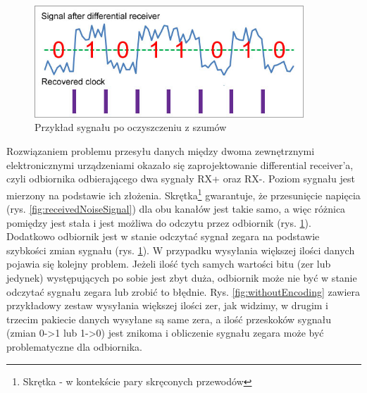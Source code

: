 \documentclass{BscUS}
\begin{document}
\begin{figure}[H]
\centering
\includegraphics[width=0.9\textwidth]{./img/receivedCleanedSignal}
\caption{Przykład sygnału po oczyszczeniu z szumów \cite{receivedCleanedSignal}}
\label{fig:receivedCleanedSignal}
\end{figure}
\noindent Rozwiązaniem problemu przesyłu danych między dwoma zewnętrznymi elektronicznymi urządzeniami okazało się zaprojektowanie differential receiver'a, czyli odbiornika odbierającego dwa sygnały RX+ oraz RX-. Poziom sygnału jest mierzony na podstawie ich złożenia. Skrętka\footnote{Skrętka - w kontekście pary skręconych przewodów} gwarantuje, że przesunięcie napięcia (rys. \ref{fig:receivedNoiseSignal}) dla obu kanałów jest takie samo, a więc różnica pomiędzy jest stała i jest możliwa do odczytu przez odbiornik (rys. \ref{fig:receivedCleanedSignal}). Dodatkowo odbiornik jest w stanie odczytać sygnał zegara na podstawie szybkości zmian sygnału (rys. \ref{fig:receivedCleanedSignal}).
\newline
\indent W przypadku wysyłania większej ilości danych pojawia się kolejny problem. Jeżeli ilość tych samych wartości bitu (zer lub jedynek) występujących po sobie jest zbyt duża, odbiornik może nie być w stanie odczytać sygnału zegara lub zrobić to błędnie. Rys. \ref{fig:withoutEncoding} zawiera przykładowy zestaw wysyłania większej ilości zer, jak widzimy, w drugim i trzecim pakiecie danych wysyłane są same zera, a ilość przeskoków sygnału (zmian 0->1 lub 1->0) jest znikoma i obliczenie sygnału zegara może być problematyczne dla odbiornika.
\end{document}
